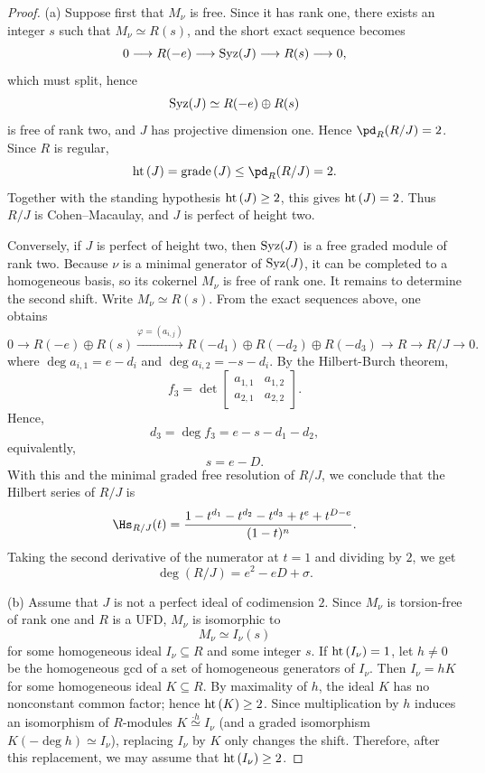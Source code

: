 \documentclass[11pt]{amsart} %
\newcommand{\lar}{\longrightarrow}
\theoremstyle{definition}
\def\phi{\varphi}
\def\hht{{\rm ht}\,}
\def\grade{{\rm grade}\,}
\def\syz{\mbox{\rm Syz}}
\def\phi{\varphi}
\def\hht{{\rm ht}\,}
\def\grade{{\rm grade}\,}
\begin{document}
\begin{proof}
\noindent
(a) Suppose first that $M_\nu$ is free. Since it has rank one, there exists an integer
$s$ such that $M_\nu\simeq R(s)$, and the short exact sequence becomes
\[
0\lar R(-e)\lar \syz(J)\lar R(s)\lar 0,
\]
which must split, hence
\[
\syz(J)\simeq R(-e)\oplus R(s)
\]
is free of rank two, and $J$ has projective dimension one. Hence $\pd_R(R/J)=2$. Since $R$ is regular,
\[
\hht(J)=\grade(J)\le\pd_R(R/J)=2.
\]
Together with the standing hypothesis $\hht(J)\ge2$, this gives
$\hht(J)=2$. Thus $R/J$ is Cohen--Macaulay, and $J$ is perfect
of height two.

Conversely, if $J$ is perfect of height two, then $\syz(J)$ is a free graded module of rank two.
Because $\nu$ is a minimal generator of $\syz(J)$, it can be completed to a homogeneous
basis, so its cokernel $M_\nu$ is free of rank one. It remains to determine the second shift. Write $M_\nu\simeq R(s)$. From the exact
sequences above, one obtains
\[
0\lar R(-e)\oplus R(s)
\stackrel{\phi=(a_{i,j})}\lar
R(-d_1)\oplus R(-d_2)\oplus R(-d_3)
\lar R\to R/J\lar 0.
\]
where $\deg a_{i,1}=e-d_i$ and $\deg a_{i,2}=-s-d_i$. By the Hilbert-Burch theorem, \[f_3=\det\begin{bmatrix}
    a_{1,1}&a_{1,2}\\
    a_{2,1}&a_{2,2}
\end{bmatrix}.\] Hence, 
\[d_3=\deg f_3=e-s-d_1-d_2,\]
equivalently,
$$s=e-D.$$
With this and the minimal graded free resolution of $R/J$, we conclude that the Hilbert series of $R/J$ is
\[
\Hs_{R/J}(t)=\frac{1-t^{d_1}-t^{d_2}-t^{d_3}+t^e+t^{D-e}}{(1-t)^{n}}.
\] Taking the second derivative of the numerator at $t=1$ and dividing by $2$, we get
\[
\deg(R/J)=e^2-eD+\sigma.
\]

\smallskip

\noindent
{\rm(b)} Assume that $J$ is not a perfect ideal of codimension $2$. Since $M_\nu$ is torsion-free of rank one and $R$ is a UFD, $M_\nu$ is isomorphic to
\[
M_\nu\simeq I_\nu(s)
\]
for some homogeneous ideal $I_\nu\subseteq R$ and some integer $s$. If $\hht(I_\nu)=1$, let $h\neq 0$ be the homogeneous gcd of a set of homogeneous generators of $I_\nu$. Then $I_\nu=hK$ for some homogeneous ideal $K\subseteq R$. By maximality of $h$, the ideal $K$
has no nonconstant common factor; hence $\hht(K)\ge 2$. Since multiplication by $h$ induces an isomorphism of $R$-modules $K\overset{\cdot h}{\simeq} I_\nu$ (and a graded isomorphism $K(-\deg h)\simeq I_\nu$), replacing $I_\nu$ by $K$ only changes the shift. Therefore, after this replacement, we may assume that
$\hht(I_\nu)\ge 2$.



\end{proof}
\end{document}

